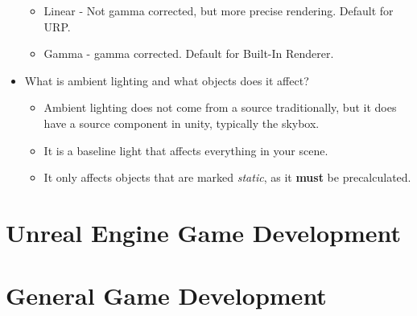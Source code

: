 \documentclass{article}
\begin{document}
\begin{itemize}
    \begin{itemize}
        \item Linear - Not gamma corrected, but more precise rendering. Default for URP.
        \item Gamma - gamma corrected. Default for Built-In Renderer. 
    \end{itemize}
    \item What is ambient lighting and what objects does it affect?
    \begin{itemize}
        \item Ambient lighting does not come from a source traditionally, but it does have a source component in unity, typically the skybox.
        \item It is a baseline light that affects everything in your scene.
        \item It only affects objects that are marked \textit{static}, as it \textbf{must} be precalculated.
    \end{itemize}
\end{itemize}

\newpage
\section{Unreal Engine Game Development}

\newpage
\section{General Game Development}
\end{document}
